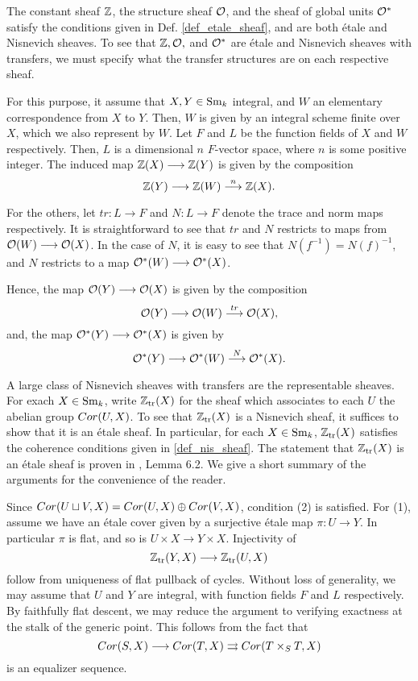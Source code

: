 \begin{ex}\label{ex_Z_O_Ostar}
The constant sheaf $\mathbb{Z}$, the structure sheaf $\mathcal{O}$, and the sheaf
of global units $\mathcal{O}^*$ satisfy the conditions given in Def. 
\ref{def_etale_sheaf}, and are both \'etale and Nisnevich sheaves.
To see that $\mathbb{Z}, \mathcal{O},$ and $\mathcal{O}^*$ are \'etale and Nisnevich sheaves
with transfers, we must specify what the transfer structures are
on each respective sheaf.

For this purpose, it assume that $X, Y \in \mathrm{Sm}_{k}$ integral, and
$W$ an elementary correspondence from $X$ to $Y$. Then, $W$ is
given by an integral scheme finite over $X$, which we also 
represent by $W$. Let $F$ and $L$ be the function fields of $X$ 
and $W$ respectively. Then, $L$ is a dimensional $n$ $F$-vector 
space, where $n$ is some positive integer. The induced map $\mathbb{Z}(X) 
\longrightarrow \mathbb{Z}(Y)$ is given by the composition
\[
\mathbb{Z}(Y) \longrightarrow \mathbb{Z}(W) \stackrel{n}{\longrightarrow} \mathbb{Z}(X).
\]

For the others, let $tr: L \to F$ and $N: L \to F$ denote the 
trace and norm maps respectively. It is straightforward to see 
that $tr$ and $N$ restricts to maps from $\mathcal{O}(W) \longrightarrow \mathcal{O}(X)$. In
the case of $N$, it is easy to see that $N(f^{-1}) = N(f)^{-1}$,
and $N$ restricts to a map $\mathcal{O}^*(W) \longrightarrow \mathcal{O}^*(X)$.

Hence, the map $\mathcal{O}(Y) \longrightarrow \mathcal{O}(X)$ is given by the composition
\[
\mathcal{O}(Y) \longrightarrow \mathcal{O}(W) \stackrel{tr}{\longrightarrow} \mathcal{O}(X),
\]
and, the map $\mathcal{O}^*(Y) \longrightarrow \mathcal{O}^*(X)$ is given by
\[
\mathcal{O}^*(Y) \longrightarrow \mathcal{O}^*(W) \stackrel{N}{\longrightarrow} \mathcal{O}^*(X).
\]
\end{ex}

\begin{ex}
A large class of Nisnevich sheaves with transfers are the 
representable sheaves. For exach $X \in \mathrm{Sm}_{k}$, write $\mathbb{Z}_{\mathrm{tr}}(X)$
for the sheaf which associates to each $U$ the abelian group
$Cor(U, X)$. To see that $\mathbb{Z}_{\mathrm{tr}}(X)$ is a Nisnevich sheaf, it
suffices to show that it is an \'etale sheaf. In particular,
for each $X \in \mathrm{Sm}_{k}$, $\mathbb{Z}_{\mathrm{tr}}(X)$ satisfies the coherence 
conditions given in \ref{def_nis_sheaf}. The statement that
$\mathbb{Z}_{\mathrm{tr}}(X)$ is an \'etale sheaf is proven in \cite{MVW}, Lemma 6.2.
We give a short summary of the arguments for the convenience of
the reader.

Since $Cor(U \sqcup V, X) = Cor(U, X) \oplus Cor(V, X)$, condition 
(2) is satisfied. For (1), assume we have an \'etale cover given
by a surjective \'etale map $\pi: U \to Y$. In particular $\pi$ is
flat, and so is $U \times X \to Y \times X$. Injectivity of
\[
\mathbb{Z}_{\mathrm{tr}}(Y, X) \longrightarrow \mathbb{Z}_{\mathrm{tr}}(U, X)
\]
follow from uniqueness of flat pullback of cycles. Without loss
of generality, we may assume that $U$ and $Y$ are integral, with
function fields $F$ and $L$ respectively. By faithfully flat 
descent, we may reduce the argument to verifying exactness at
the stalk of the generic point. This follows from the fact that
\[
Cor(S, X) \longrightarrow Cor(T, X) \rightrightarrows Cor(T \times_S T, X)
\]
is an equalizer sequence.
\end{ex}


